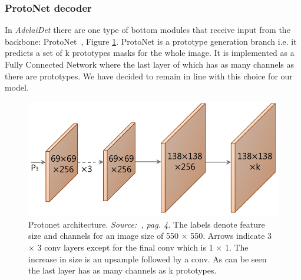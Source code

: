 \documentclass[10pt,twocolumn,letterpaper]{article}
\begin{document}
\subsubsection{ProtoNet decoder}
In \textit{AdelaiDet} there are one type of bottom modules that receive input from the backbone: ProtoNet~\cite{protonet}, Figure \ref{fig:protonet}. ProtoNet is a prototype generation branch i.e. it predicts a set of k prototypes masks for the whole image. It is implemented as a Fully Connected Network where the last layer of which has as many channels as there are prototypes. %
We have decided to remain in line with this choice for our model.
\begin{figure}[H]
\centering
  \includegraphics[width=0.65\linewidth]{./image/protonet.png} 
  \caption{Protonet architecture. \textit{Source:~\cite{protonet}, pag. 4.}
The labels denote feature size and channels for an image size of 550 $\times$ 550. Arrows indicate 3 $\times$ 3 conv layers except for the final conv which is 1 $\times$ 1. The increase in size is an upsample followed by a conv. As can be seen the last layer has as many channels as k prototypes.}
  \label{fig:protonet}
\noindent
\end{figure}
\end{document}
